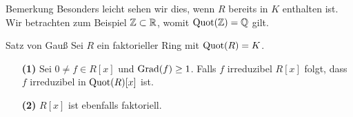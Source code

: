 \begin{generic_no_num}{Bemerkung}
	Besonders leicht sehen wir dies, wenn $R$ bereits in $K$ enthalten ist.
	Wir betrachten zum Beispiel $\mathbb{Z} \subset \mathbb{R}  $, womit $\operatorname{Quot}(\mathbb{Z}) = \mathbb{Q}$ gilt.
\end{generic_no_num}

\begin{genericthm}{Satz von Gauß}\label{skript:10.9} 
	Sei $R$ ein faktorieller Ring mit $\operatorname{Quot}(R) = K$.
	\begin{enumerate}
		\item[\textbf{(1)}]
		Sei $0 \neq f \in R[x]$ und $\operatorname{Grad}(f) \geq 1$.
		Falls $f$ irreduzibel $R[x]$ folgt,
		dass $f$ irreduzibel in $\operatorname{Quot}(R)[x]$ ist.
		
		\item[\textbf{(2)}]
		$R[x]$ ist ebenfalls faktoriell.
	\end{enumerate}
\end{genericthm}

